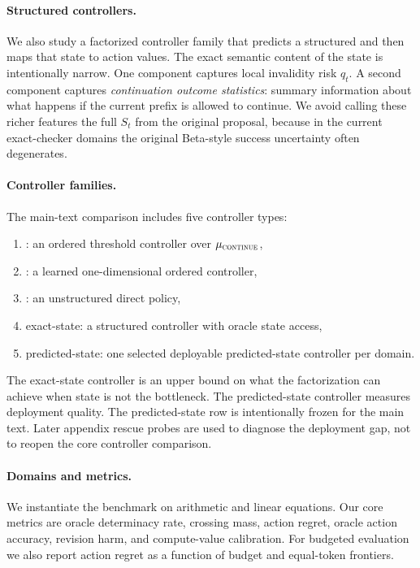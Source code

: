 \paragraph{Structured controllers.}
We also study a factorized controller family that predicts a structured \processstate and then maps that state to action values.
The exact semantic content of the state is intentionally narrow.
One component captures local invalidity risk \(q_t\).
A second component captures \emph{continuation outcome statistics}: summary information about what happens if the current prefix is allowed to continue.
We avoid calling these richer features the full \(S_t\) from the original proposal, because in the current exact-checker domains the original Beta-style success uncertainty often degenerates.

\paragraph{Controller families.}
The main-text comparison includes five controller types:
\begin{enumerate}[leftmargin=1.5em]
  \item \orderedscalar: an ordered threshold controller over \(\mu_{\textsc{continue}}\),
  \item \learnedoned: a learned one-dimensional ordered controller,
  \item \directpolicy: an unstructured direct policy,
  \item \triver exact-state: a structured controller with oracle state access,
  \item \triver predicted-state: one selected deployable predicted-state controller per domain.
\end{enumerate}
The exact-state controller is an upper bound on what the factorization can achieve when state is not the bottleneck.
The predicted-state controller measures deployment quality.
The predicted-state row is intentionally frozen for the main text.
Later appendix rescue probes are used to diagnose the deployment gap, not to reopen the core controller comparison.

\paragraph{Domains and metrics.}
We instantiate the benchmark on arithmetic and linear equations.
Our core metrics are oracle determinacy rate, crossing mass, action regret, oracle action accuracy, revision harm, and compute-value calibration.
For budgeted evaluation we also report action regret as a function of budget and equal-token frontiers.
